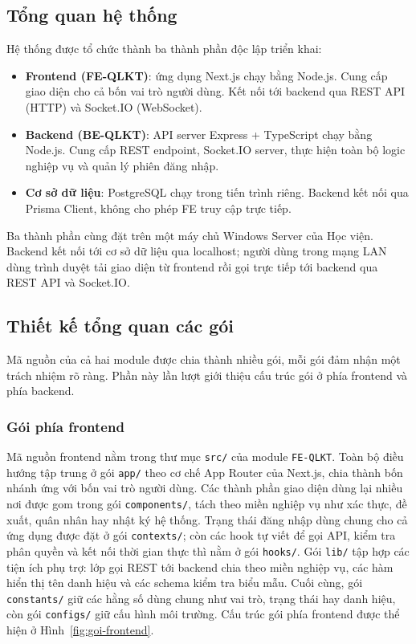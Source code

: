 \documentclass[../DoAn.tex]{subfiles}
\begin{document}
\subsection{Tổng quan hệ thống}
\label{subsection:4.1.2}

Hệ thống được tổ chức thành ba thành phần độc lập triển khai:

\begin{itemize}
    \item \textbf{Frontend (FE-QLKT)}: ứng dụng Next.js chạy bằng Node.js. Cung cấp giao diện cho cả bốn vai trò người dùng. Kết nối tới backend qua REST API (HTTP) và Socket.IO (WebSocket).
    \item \textbf{Backend (BE-QLKT)}: API server Express + TypeScript chạy bằng Node.js. Cung cấp REST endpoint, Socket.IO server, thực hiện toàn bộ logic nghiệp vụ và quản lý phiên đăng nhập.
    \item \textbf{Cơ sở dữ liệu}: PostgreSQL chạy trong tiến trình riêng. Backend kết nối qua Prisma Client, không cho phép FE truy cập trực tiếp.
\end{itemize}

Ba thành phần cùng đặt trên một máy chủ Windows Server của Học viện. Backend kết nối tới cơ sở dữ liệu qua localhost; người dùng trong mạng LAN dùng trình duyệt tải giao diện từ frontend rồi gọi trực tiếp tới backend qua REST API và Socket.IO.

\subsection{Thiết kế tổng quan các gói}
\label{subsection:4.1.3}

Mã nguồn của cả hai module được chia thành nhiều gói, mỗi gói đảm nhận một trách nhiệm rõ ràng. Phần này lần lượt giới thiệu cấu trúc gói ở phía frontend và phía backend.

\subsubsection{Gói phía frontend}

Mã nguồn frontend nằm trong thư mục \texttt{src/} của module \texttt{FE-QLKT}.
Toàn bộ điều hướng tập trung ở gói \texttt{app/} theo cơ chế App Router của Next.js, chia thành bốn nhánh ứng với bốn vai trò người dùng.
Các thành phần giao diện dùng lại nhiều nơi được gom trong gói \texttt{components/}, tách theo miền nghiệp vụ như xác thực, đề xuất, quân nhân hay nhật ký hệ thống.
Trạng thái đăng nhập dùng chung cho cả ứng dụng được đặt ở gói \texttt{contexts/}; còn các hook tự viết để gọi API, kiểm tra phân quyền và kết nối thời gian thực thì nằm ở gói \texttt{hooks/}.
Gói \texttt{lib/} tập hợp các tiện ích phụ trợ: lớp gọi REST tới backend chia theo miền nghiệp vụ, các hàm hiển thị tên danh hiệu và các schema kiểm tra biểu mẫu.
Cuối cùng, gói \texttt{constants/} giữ các hằng số dùng chung như vai trò, trạng thái hay danh hiệu, còn gói \texttt{configs/} giữ cấu hình môi trường.
Cấu trúc gói phía frontend được thể hiện ở Hình~\ref{fig:goi-frontend}.
\end{document}
